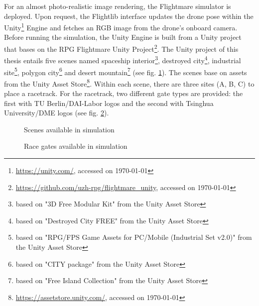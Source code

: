 For an almost photo-realistic image rendering,
the Flightmare \cite{Song2020} simulator 
is deployed.
Upon request, the Flightlib interface
updates the drone pose 
within the Unity\footnote{
    \url{https://unity.com/}, accessed on \today
} Engine
and fetches an RGB image from the drone's onboard camera.
Before running the simulation,
the Unity Engine is built from a Unity project
that bases on the RPG Flightmare Unity Project\footnote{
    \url{https://github.com/uzh-rpg/flightmare_unity}, accessed on \today
}.
The Unity project of this thesis
entails five scenes
named
spaceship interior\footnote{
    based on "3D Free Modular Kit" from the Unity Asset Store
},
destroyed city\footnote{
    based on "Destroyed City FREE" from the Unity Asset Store
},
industrial site\footnote{
    based on "RPG/FPS Game Assets for PC/Mobile (Industrial Set v2.0)" from the Unity Asset Store
},
polygon city\footnote{
    based on "CITY package" from the Unity Asset Store
}
and desert mountain\footnote{
    based on "Free Island Collection" from the Unity Asset Store
}
(see fig. \ref{fig:unity_scenes}).
The scenes base on assets from the Unity Asset Store\footnote{
    \url{https://assetstore.unity.com/}, accessed on \today
}.
Within each scene, there are three sites (A, B, C) to place a racetrack.
For the racetrack, two different gate types are provided:
the first with TU Berlin/DAI-Labor logos and 
the second with Tsinghua University/DME logos
(see fig. \ref{fig:unity_gates}).
\begin{figure}
    \centering
    \par
    \caption[
        Scenes available in simulation
    ]{
        Scenes available in simulation
        \label{fig:unity_scenes}
    }
\end{figure}
\begin{figure}[h]
    \centering
    \caption[
        Race gates available in simulation
    ]{
        Race gates available in simulation
        \label{fig:unity_gates}
    }
\end{figure}

